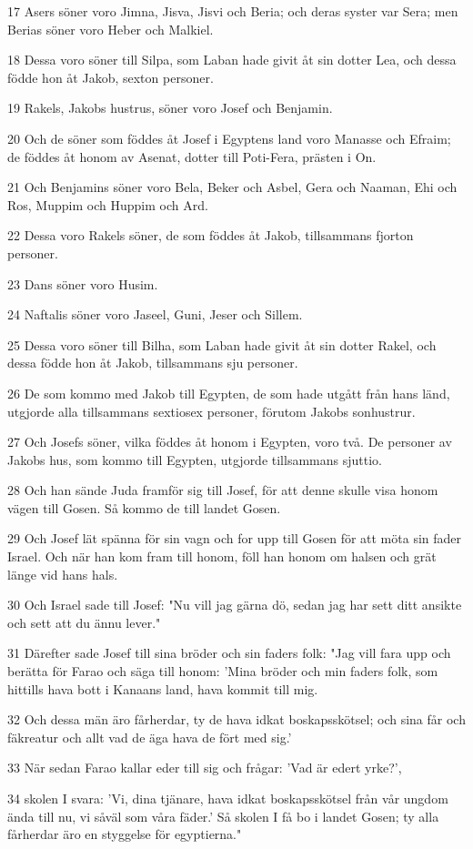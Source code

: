 \par 17 Asers söner voro Jimna, Jisva, Jisvi och Beria; och deras syster var Sera; men Berias söner voro Heber och Malkiel.
\par 18 Dessa voro söner till Silpa, som Laban hade givit åt sin dotter Lea, och dessa födde hon åt Jakob, sexton personer.
\par 19 Rakels, Jakobs hustrus, söner voro Josef och Benjamin.
\par 20 Och de söner som föddes åt Josef i Egyptens land voro Manasse och Efraim; de föddes åt honom av Asenat, dotter till Poti-Fera, prästen i On.
\par 21 Och Benjamins söner voro Bela, Beker och Asbel, Gera och Naaman, Ehi och Ros, Muppim och Huppim och Ard.
\par 22 Dessa voro Rakels söner, de som föddes åt Jakob, tillsammans fjorton personer.
\par 23 Dans söner voro Husim.
\par 24 Naftalis söner voro Jaseel, Guni, Jeser och Sillem.
\par 25 Dessa voro söner till Bilha, som Laban hade givit åt sin dotter Rakel, och dessa födde hon åt Jakob, tillsammans sju personer.
\par 26 De som kommo med Jakob till Egypten, de som hade utgått från hans länd, utgjorde alla tillsammans sextiosex personer, förutom Jakobs sonhustrur.
\par 27 Och Josefs söner, vilka föddes åt honom i Egypten, voro två. De personer av Jakobs hus, som kommo till Egypten, utgjorde tillsammans sjuttio.
\par 28 Och han sände Juda framför sig till Josef, för att denne skulle visa honom vägen till Gosen. Så kommo de till landet Gosen.
\par 29 Och Josef lät spänna för sin vagn och for upp till Gosen för att möta sin fader Israel. Och när han kom fram till honom, föll han honom om halsen och grät länge vid hans hals.
\par 30 Och Israel sade till Josef: "Nu vill jag gärna dö, sedan jag har sett ditt ansikte och sett att du ännu lever."
\par 31 Därefter sade Josef till sina bröder och sin faders folk: "Jag vill fara upp och berätta för Farao och säga till honom: 'Mina bröder och min faders folk, som hittills hava bott i Kanaans land, hava kommit till mig.
\par 32 Och dessa män äro fårherdar, ty de hava idkat boskapsskötsel; och sina får och fäkreatur och allt vad de äga hava de fört med sig.'
\par 33 När sedan Farao kallar eder till sig och frågar: 'Vad är edert yrke?',
\par 34 skolen I svara: 'Vi, dina tjänare, hava idkat boskapsskötsel från vår ungdom ända till nu, vi såväl som våra fäder.' Så skolen I få bo i landet Gosen; ty alla fårherdar äro en styggelse för egyptierna."

